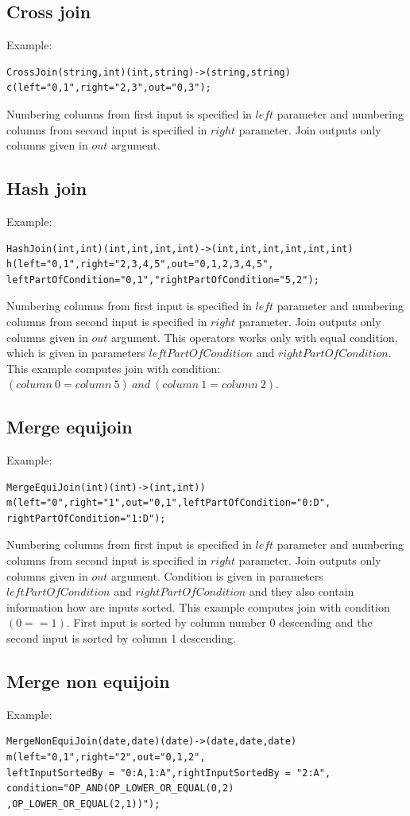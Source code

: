 \subsection{Cross join}
Example:
\begin{lstlisting} 
CrossJoin(string,int)(int,string)->(string,string)
c(left="0,1",right="2,3",out="0,3");
\end{lstlisting}
Numbering columns from first input is specified in $left$ parameter and numbering columns from second input is specified in $right$ parameter. Join outputs only columns given in $out$ argument. 

\subsection{Hash join}
Example:
\begin{lstlisting}
HashJoin(int,int)(int,int,int,int)->(int,int,int,int,int,int)
h(left="0,1",right="2,3,4,5",out="0,1,2,3,4,5",
leftPartOfCondition="0,1","rightPartOfCondition="5,2"); 
\end{lstlisting}
Numbering columns from first input is specified in $left$ parameter and numbering columns from second input is specified in $right$ parameter. Join outputs only columns given in $out$ argument. This operators works only with equal condition, which is given in parameters $leftPartOfCondition$ and $rightPartOfCondition$. This example computes join with condition:\\
 $(column~0=column~5)~and~(column~1=column~2)$.

\subsection{Merge equijoin}
Example:
\begin{lstlisting}
MergeEquiJoin(int)(int)->(int,int))
m(left="0",right="1",out="0,1",leftPartOfCondition="0:D",
rightPartOfCondition="1:D");
\end{lstlisting}
Numbering columns from first input is specified in $left$ parameter and numbering columns from second input is specified in $right$ parameter. Join outputs only columns given in $out$ argument. Condition is given in parameters $leftPartOfCondition$ and $rightPartOfCondition$ and they also contain information how are inputs sorted. This example computes join with condition $(0==1)$. First input is sorted by column number 0 descending and the second input is sorted by column 1 descending.

\subsection{Merge non equijoin}
Example:
\begin{lstlisting}
MergeNonEquiJoin(date,date)(date)->(date,date,date)
m(left="0,1",right="2",out="0,1,2",
leftInputSortedBy = "0:A,1:A",rightInputSortedBy = "2:A",
condition="OP_AND(OP_LOWER_OR_EQUAL(0,2)
,OP_LOWER_OR_EQUAL(2,1))");
\end{lstlisting}

